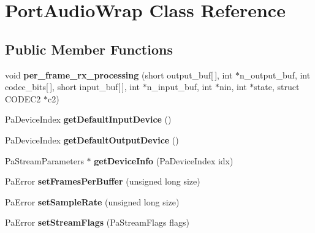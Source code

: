 \hypertarget{class_port_audio_wrap}{\section{Port\-Audio\-Wrap Class Reference}
\label{class_port_audio_wrap}
}
\subsection*{Public Member Functions}
\begin{DoxyCompactItemize}
\item 
\hypertarget{class_port_audio_wrap_a4af13f96f4f8639148668c89942b3365}{void {\bfseries per\-\_\-frame\-\_\-rx\-\_\-processing} (short output\-\_\-buf\mbox{[}$\,$\mbox{]}, int $\ast$n\-\_\-output\-\_\-buf, int codec\-\_\-bits\mbox{[}$\,$\mbox{]}, short input\-\_\-buf\mbox{[}$\,$\mbox{]}, int $\ast$n\-\_\-input\-\_\-buf, int $\ast$nin, int $\ast$state, struct C\-O\-D\-E\-C2 $\ast$c2)}\label{class_port_audio_wrap_a4af13f96f4f8639148668c89942b3365}

\item 
\hypertarget{class_port_audio_wrap_a2a122bf5de62e7f1fb1bfed6801e063c}{Pa\-Device\-Index {\bfseries get\-Default\-Input\-Device} ()}\label{class_port_audio_wrap_a2a122bf5de62e7f1fb1bfed6801e063c}

\item 
\hypertarget{class_port_audio_wrap_a8cde3f5f6f312fbd8c0ad60619d617ad}{Pa\-Device\-Index {\bfseries get\-Default\-Output\-Device} ()}\label{class_port_audio_wrap_a8cde3f5f6f312fbd8c0ad60619d617ad}

\item 
\hypertarget{class_port_audio_wrap_a246ec79a44d879a74d6afe3e1005bc00}{Pa\-Stream\-Parameters $\ast$ {\bfseries get\-Device\-Info} (Pa\-Device\-Index idx)}\label{class_port_audio_wrap_a246ec79a44d879a74d6afe3e1005bc00}

\item 
\hypertarget{class_port_audio_wrap_a34ec7a96cbe5859f4a6aba6cb4b508cf}{Pa\-Error {\bfseries set\-Frames\-Per\-Buffer} (unsigned long size)}\label{class_port_audio_wrap_a34ec7a96cbe5859f4a6aba6cb4b508cf}

\item 
\hypertarget{class_port_audio_wrap_a7245832a8cafbc8d140a51e106838fbb}{Pa\-Error {\bfseries set\-Sample\-Rate} (unsigned long size)}\label{class_port_audio_wrap_a7245832a8cafbc8d140a51e106838fbb}

\item 
\hypertarget{class_port_audio_wrap_a47fe0dd437c0a4693824966e7100255a}{Pa\-Error {\bfseries set\-Stream\-Flags} (Pa\-Stream\-Flags flags)}\label{class_port_audio_wrap_a47fe0dd437c0a4693824966e7100255a}


\end{DoxyCompactItemize}
